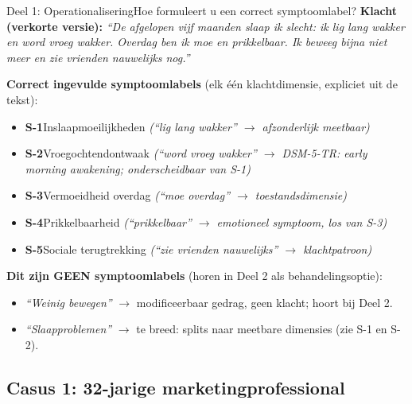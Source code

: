 \documentclass[11pt,a4paper]{article}
\begin{document}
\begin{voorbeeldbox}{Deel 1: Operationalisering}{Hoe formuleert u een correct symptoomlabel?}
\small
\textbf{Klacht (verkorte versie):} \textit{``De afgelopen vijf maanden slaap ik slecht:
ik lig lang wakker en word vroeg wakker. Overdag ben ik moe en prikkelbaar. Ik beweeg
bijna niet meer en zie vrienden nauwelijks nog.''}

\medskip
\textbf{Correct ingevulde symptoomlabels} (elk één klachtdimensie, expliciet uit de tekst):
\begin{itemize}[topsep=2pt,itemsep=1pt]
\item \textbf{S-1}\enspace Inslaapmoeilijkheden
  \hfill\textit{(``lig lang wakker'' $\rightarrow$ afzonderlijk meetbaar)}
\item \textbf{S-2}\enspace Vroegochtendontwaak
  \hfill\textit{(``word vroeg wakker'' $\rightarrow$ DSM-5-TR: early morning awakening; onderscheidbaar van S-1)}
\item \textbf{S-3}\enspace Vermoeidheid overdag
  \hfill\textit{(``moe overdag'' $\rightarrow$ toestandsdimensie)}
\item \textbf{S-4}\enspace Prikkelbaarheid
  \hfill\textit{(``prikkelbaar'' $\rightarrow$ emotioneel symptoom, los van S-3)}
\item \textbf{S-5}\enspace Sociale terugtrekking
  \hfill\textit{(``zie vrienden nauwelijks'' $\rightarrow$ klachtpatroon)}
\end{itemize}

\medskip
\textbf{\color{StrongRed}Dit zijn GEEN symptoomlabels} (horen in Deel 2 als behandelingsoptie):
\begin{itemize}[topsep=1pt,itemsep=0pt]
\item \textit{``Weinig bewegen''} $\rightarrow$ modificeerbaar gedrag, geen klacht; hoort bij Deel 2.
\item \textit{``Slaapproblemen''} $\rightarrow$ te breed: splits naar meetbare dimensies (zie S-1 en S-2).
\end{itemize}
\end{voorbeeldbox}

\vspace{0.5em}

\newpage

\subsection*{Casus 1: 32-jarige marketingprofessional}
\end{document}
